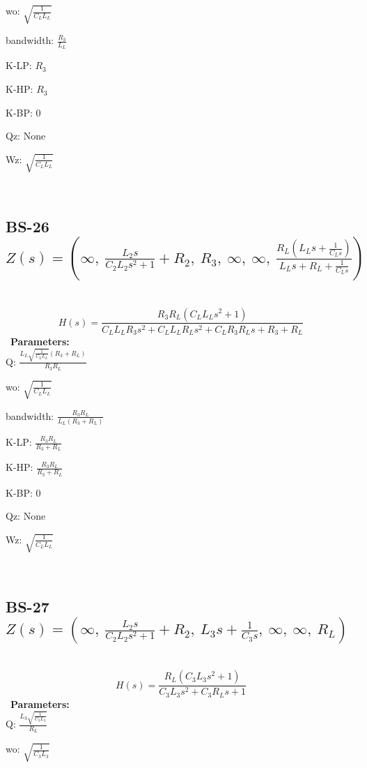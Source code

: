 \documentclass{article}
\begin{document}
wo: $\sqrt{\frac{1}{C_{L} L_{L}}}$\ 

bandwidth: $\frac{R_{3}}{L_{L}}$\ 

K-LP: $R_{3}$\ 

K-HP: $R_{3}$\ 

K-BP: $0$\ 

Qz: $\text{None}$\ 

Wz: $\sqrt{\frac{1}{C_{L} L_{L}}}$\ 

\ 

\subsection{BS-26 $Z(s) = \left( \infty, \  \frac{L_{2} s}{C_{2} L_{2} s^{2} + 1} + R_{2}, \  R_{3}, \  \infty, \  \infty, \  \frac{R_{L} \left(L_{L} s + \frac{1}{C_{L} s}\right)}{L_{L} s + R_{L} + \frac{1}{C_{L} s}}\right)$ } \ 
\textbf{\[H(s) = \frac{R_{3} R_{L} \left(C_{L} L_{L} s^{2} + 1\right)}{C_{L} L_{L} R_{3} s^{2} + C_{L} L_{L} R_{L} s^{2} + C_{L} R_{3} R_{L} s + R_{3} + R_{L}}\] } \ 
\textbf{Parameters:}\\ 

Q: $\frac{L_{L} \sqrt{\frac{1}{C_{L} L_{L}}} \left(R_{3} + R_{L}\right)}{R_{3} R_{L}}$\ 

wo: $\sqrt{\frac{1}{C_{L} L_{L}}}$\ 

bandwidth: $\frac{R_{3} R_{L}}{L_{L} \left(R_{3} + R_{L}\right)}$\ 

K-LP: $\frac{R_{3} R_{L}}{R_{3} + R_{L}}$\ 

K-HP: $\frac{R_{3} R_{L}}{R_{3} + R_{L}}$\ 

K-BP: $0$\ 

Qz: $\text{None}$\ 

Wz: $\sqrt{\frac{1}{C_{L} L_{L}}}$\ 

\ 

\subsection{BS-27 $Z(s) = \left( \infty, \  \frac{L_{2} s}{C_{2} L_{2} s^{2} + 1} + R_{2}, \  L_{3} s + \frac{1}{C_{3} s}, \  \infty, \  \infty, \  R_{L}\right)$ } \ 
\textbf{\[H(s) = \frac{R_{L} \left(C_{3} L_{3} s^{2} + 1\right)}{C_{3} L_{3} s^{2} + C_{3} R_{L} s + 1}\] } \ 
\textbf{Parameters:}\\ 

Q: $\frac{L_{3} \sqrt{\frac{1}{C_{3} L_{3}}}}{R_{L}}$\ 

wo: $\sqrt{\frac{1}{C_{3} L_{3}}}$\ 
\end{document}
